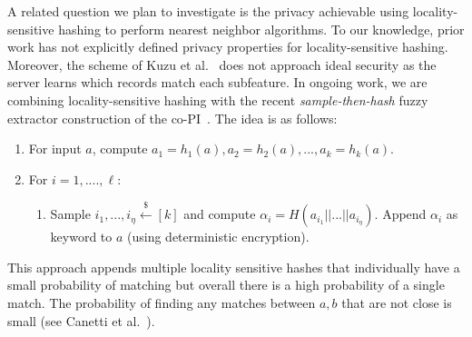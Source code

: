  A related question we plan to investigate is the privacy achievable using locality-sensitive hashing to perform nearest neighbor algorithms.  To our knowledge, prior work has not explicitly defined privacy properties for locality-sensitive hashing.  Moreover, the scheme of Kuzu et al.~\cite{kuzu2012efficient}  does not approach ideal security as the server learns which records match each subfeature.  In ongoing work, we are combining locality-sensitive hashing with the recent \emph{sample-then-hash} fuzzy extractor construction of the co-PI~\cite{EC:CFPRS16}.  The idea is as follows:

\begin{enumerate}\setlength\itemsep{0em}
\item For input $a$, compute $a_1 = h_1(a), a_2 = h_2(a),..., a_k = h_k(a)$.
\item For $i=1,...., \ell$:
\begin{enumerate}\setlength\itemsep{0em}
\item Sample $i_1,..., i_\eta\overset{\$}\leftarrow [k]$ and compute $\alpha_i = H(a_{i_1} || ... || a_{i_\eta})$. Append $\alpha_i$ as keyword to $a$ (using deterministic encryption).
\end{enumerate}
\end{enumerate}
\noindent
This approach appends multiple locality sensitive hashes that individually have a small probability of matching but overall there is a high probability of a single match.  The probability of finding any matches between $a,b$ that are not close is small (see Canetti et al.~\cite{EC:CFPRS16}).

